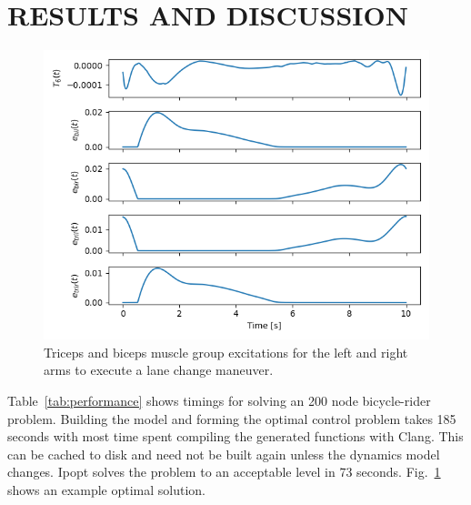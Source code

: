 \documentclass[11pt,twocolumn]{article}
\begin{document}

\vspace{-1em}
\section*{RESULTS AND DISCUSSION}
\vspace{-1em}
%
\begin{figure}
    \centering
    \includegraphics[width=\linewidth]{figures/arm-muscle-bicycle-excitation.png}
    \caption{Triceps and biceps muscle group excitations for the left and right
      arms to execute a lane change maneuver.}
    \label{fig:trajectories}
\end{figure}

Table~\ref{tab:performance} shows timings for solving an 200 node bicycle-rider
problem. Building the model and forming the optimal control problem takes 185
seconds with most time spent compiling the generated functions with Clang. This
can be cached to disk and need not be built again unless the dynamics model
changes. Ipopt solves the problem to an acceptable level in 73 seconds.
Fig.~\ref{fig:trajectories} shows an example optimal solution.
\end{document}
